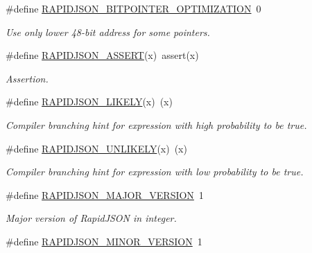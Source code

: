 \begin{DoxyCompactItemize}
\#define \hyperlink{group___r_a_p_i_d_j_s_o_n___c_o_n_f_i_g_ga93fb983f78208d12c822376e1ea6d185}{R\+A\+P\+I\+D\+J\+S\+O\+N\+\_\+B\+I\+T\+P\+O\+I\+N\+T\+E\+R\+\_\+\+O\+P\+T\+I\+M\+I\+Z\+A\+T\+I\+ON}~0
\begin{DoxyCompactList}\small\item\em Use only lower 48-\/bit address for some pointers. \end{DoxyCompactList}\item 
\#define \hyperlink{group___r_a_p_i_d_j_s_o_n___c_o_n_f_i_g_gabeba18d612187bad2ac62aed9276d47c}{R\+A\+P\+I\+D\+J\+S\+O\+N\+\_\+\+A\+S\+S\+E\+RT}(x)~assert(x)
\begin{DoxyCompactList}\small\item\em Assertion. \end{DoxyCompactList}\item 
\#define \hyperlink{group___r_a_p_i_d_j_s_o_n___c_o_n_f_i_g_ga5dc14176a9e71ace282404b0bcda57a1}{R\+A\+P\+I\+D\+J\+S\+O\+N\+\_\+\+L\+I\+K\+E\+LY}(x)~(x)
\begin{DoxyCompactList}\small\item\em Compiler branching hint for expression with high probability to be true. \end{DoxyCompactList}\item 
\#define \hyperlink{group___r_a_p_i_d_j_s_o_n___c_o_n_f_i_g_ga6a2b1695c13e77ae425e3cbac980ccb5}{R\+A\+P\+I\+D\+J\+S\+O\+N\+\_\+\+U\+N\+L\+I\+K\+E\+LY}(x)~(x)
\begin{DoxyCompactList}\small\item\em Compiler branching hint for expression with low probability to be true. \end{DoxyCompactList}\item 
\#define \hyperlink{group___r_a_p_i_d_j_s_o_n___c_o_n_f_i_g_gaf1ff1685be6cbebb5d4b2ab997776f45}{R\+A\+P\+I\+D\+J\+S\+O\+N\+\_\+\+M\+A\+J\+O\+R\+\_\+\+V\+E\+R\+S\+I\+ON}~1\hypertarget{group___r_a_p_i_d_j_s_o_n___c_o_n_f_i_g_gaf1ff1685be6cbebb5d4b2ab997776f45}{}\label{group___r_a_p_i_d_j_s_o_n___c_o_n_f_i_g_gaf1ff1685be6cbebb5d4b2ab997776f45}

\begin{DoxyCompactList}\small\item\em Major version of Rapid\+J\+S\+ON in integer. \end{DoxyCompactList}\item 
\#define \hyperlink{group___r_a_p_i_d_j_s_o_n___c_o_n_f_i_g_gaf9125105c593a636a79f1c2d96835376}{R\+A\+P\+I\+D\+J\+S\+O\+N\+\_\+\+M\+I\+N\+O\+R\+\_\+\+V\+E\+R\+S\+I\+ON}~1\hypertarget{group___r_a_p_i_d_j_s_o_n___c_o_n_f_i_g_gaf9125105c593a636a79f1c2d96835376}{}\label{group___r_a_p_i_d_j_s_o_n___c_o_n_f_i_g_gaf9125105c593a636a79f1c2d96835376}


\end{DoxyCompactItemize}
